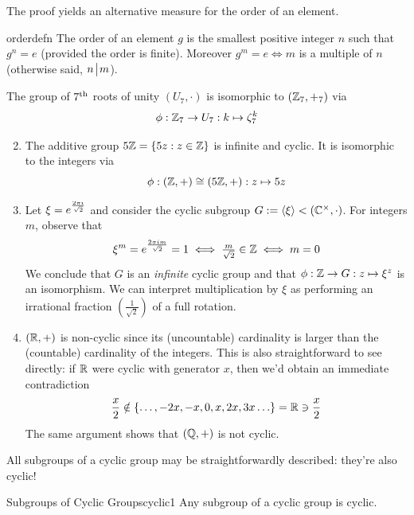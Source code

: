 
The proof yields an alternative measure for the order of an element.



\begin{cor}{}{orderdefn}
	The order of an element $g$ is the smallest positive integer $n$ such that $g^n=e$ (provided the order is finite). Moreover $g^m=e\Longleftrightarrow m$ is a multiple of $n$ (otherwise said, $n\!\bigm|\!m$).
\end{cor}


\goodbreak

\begin{examples}{}{}
	\exstart The group of $7\textsuperscript{th}$ roots of unity $(U_7,\cdot)$ is isomorphic to $(\mathbb{Z}_7,+_7)$ via
	\[
		\phi:\mathbb{Z}_7\to U_7:k\mapsto \zeta_7^k
	\]
	\begin{enumerate}\setcounter{enumi}{1}
	  \item The additive group $5\mathbb{Z}=\{5z:z\in\mathbb{Z}\}$ is infinite and cyclic. It is isomorphic to the integers via
		\[
			\phi:(\mathbb{Z},+)\cong(5\mathbb{Z},+):z\mapsto 5z
		\]
	  
		\item Let $\xi=\smash[t]{e^{\frac{2\pi i}{\sqrt 2}}}$ and consider the cyclic subgroup $G:=\left\langle \xi\right\rangle<(\mathbb{C}^\times,\cdot)$. For integers $m$, observe that
		\[
			\xi^m=e^{\frac{2\pi im}{\sqrt 2}}=1\iff \tfrac m{\sqrt 2}\in\mathbb{Z}\iff m=0
		\]
		We conclude that $G$ is an \emph{infinite} cyclic group and that $\phi:\mathbb{Z}\to G:z\mapsto\xi^z$ is an isomorphism. We can interpret multiplication by $\xi$ as performing an irrational fraction $(\frac 1{\sqrt 2})$ of a full rotation.
		
		\item $(\mathbb{R},+)$ is non-cyclic since its (uncountable) cardinality is larger than the (countable) cardinality of the integers. This is also straightforward to see directly: if $\mathbb{R}$ were cyclic with generator $x$, then we'd obtain an immediate contradiction
		\[
			\frac x2\notin\{\ldots,-2x,-x,0,x,2x,3x\ldots\}=\mathbb{R}\ni\frac x2
		\]
		The same argument shows that $(\mathbb{Q},+)$ is not cyclic.
	\end{enumerate}
\end{examples}

\bigskip


All subgroups of a cyclic group may be straightforwardly described: they're also cyclic!

\begin{thm}{Subgroups of Cyclic Groups}{cyclic1}
	Any subgroup of a cyclic group is cyclic.
\end{thm}

